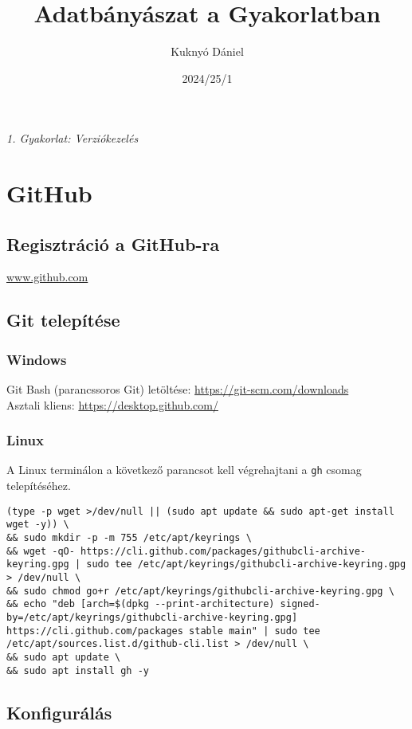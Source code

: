 \documentclass{article}
\title{\textcolor{DarkerGreen}{Adatbányászat a Gyakorlatban}}
\author{\textcolor{DarkerGreen}{Kuknyó Dániel}}
\date{\textcolor{DarkerGreen}{2024/25/1}}
\begin{document}
\maketitle

\begin{center}
\large\textit{\textcolor{DarkerGreen}{1. Gyakorlat: Verziókezelés}}
\end{center}

\section{GitHub}
\subsection*{Regisztráció a GitHub-ra}
\href{www.github.com}{www.github.com}

\subsection*{Git telepítése}
\subsubsection*{Windows}
Git Bash (parancssoros Git) letöltése: \href{https://git-scm.com/downloads}{https://git-scm.com/downloads}\\
Asztali kliens: \href{https://desktop.github.com/}{https://desktop.github.com/}

\subsubsection*{Linux}
A Linux terminálon a következő parancsot kell végrehajtani a \texttt{gh} csomag telepítéséhez.
\begin{lstlisting}
(type -p wget >/dev/null || (sudo apt update && sudo apt-get install wget -y)) \
&& sudo mkdir -p -m 755 /etc/apt/keyrings \
&& wget -qO- https://cli.github.com/packages/githubcli-archive-keyring.gpg | sudo tee /etc/apt/keyrings/githubcli-archive-keyring.gpg > /dev/null \
&& sudo chmod go+r /etc/apt/keyrings/githubcli-archive-keyring.gpg \
&& echo "deb [arch=$(dpkg --print-architecture) signed-by=/etc/apt/keyrings/githubcli-archive-keyring.gpg] https://cli.github.com/packages stable main" | sudo tee /etc/apt/sources.list.d/github-cli.list > /dev/null \
&& sudo apt update \
&& sudo apt install gh -y
\end{lstlisting}

\subsection*{Konfigurálás}
\end{document}
